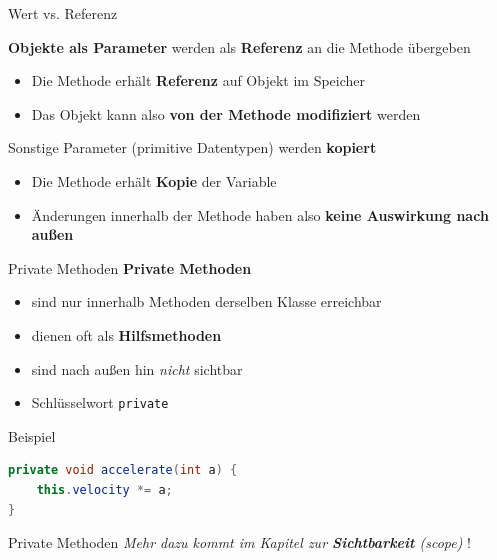 \documentclass[18pt]{beamer}
\begin{document}
\begin{frame}{Wert vs. Referenz}
    \begin{block}{}
        \textbf{Objekte als Parameter} werden als \textbf{Referenz} an die Methode übergeben
        \begin{itemize}
            \item Die Methode erhält \textbf{Referenz} auf Objekt im Speicher
            \item Das Objekt kann also \textbf{von der Methode modifiziert} werden
        \end{itemize}
    \end{block}

    \begin{block}{}
        Sonstige Parameter (primitive Datentypen) werden \textbf{kopiert}
        \begin{itemize}
            \item Die Methode erhält \textbf{Kopie} der Variable
            \item Änderungen innerhalb der Methode haben also \textbf{keine Auswirkung nach außen}
        \end{itemize}
    \end{block}
\end{frame}


\begin{frame}[fragile]{Private Methoden}
    \textbf{Private Methoden}
    \begin{itemize}
        \item sind nur innerhalb Methoden derselben Klasse erreichbar
        \item dienen oft als \textbf{Hilfsmethoden}
        \item sind nach außen hin \textit{nicht} sichtbar
        \item Schlüsselwort \texttt{private}
    \end{itemize}

    \begin{exampleblock}{Beispiel}
        \begin{lstlisting}[language=Java]
private void accelerate(int a) {
    this.velocity *= a;
}
        \end{lstlisting}
    \end{exampleblock}
\end{frame}

\begin{frame}{Private Methoden}
    \textit{Mehr dazu kommt im Kapitel zur \textbf{Sichtbarkeit} (scope)} !
\end{frame}
\end{document}
